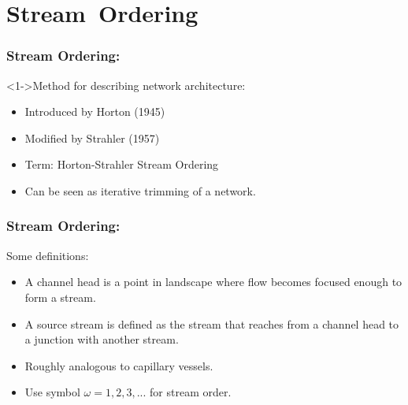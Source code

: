 \begin{frame}

  \showtarotcards{0.35}{
    john-dory,
    overview,
    complex-networks,
    random-networks,
    scale-free-networks,
    small-world-networks,
    theory-six-degrees,
    landscapes-of-forking-paths,
    networks-of-blood,
    trees-of-reality,
    orders-of-streams,
}

\end{frame}

\section{Stream\ Ordering}

\begin{frame}[label=]
  \frametitle{Stream Ordering:}

  \begin{block}<1->{Method for describing network architecture:}
    \begin{itemize}
    \item<2->
      Introduced by Horton (1945)\cite{horton1945a}
    \item<3-> 
      Modified by Strahler (1957)\cite{strahler1952a}
    \item<4-> 
      Term: Horton-Strahler Stream Ordering\cite{rodriguez-iturbe1997a}
    \item<5->
      Can be seen as \alert{iterative trimming} of a network.
    \end{itemize}
  \end{block}

\end{frame}

\begin{frame}[label=]
  \frametitle{Stream Ordering:}

  \begin{block}{Some definitions:}
    \begin{itemize}
    \item<1-> A \alert{channel head} is a point in landscape
      where flow becomes focused enough to form a stream.
    \item<2-> A \alert{source stream} is defined as the 
      stream that reaches from a channel head
      to a junction with another stream.
    \item<3-> Roughly analogous to capillary vessels.
    \item<4-> Use symbol $\omega=1, 2, 3, ...$ for stream order.
    \end{itemize}
    
  \end{block}

\end{frame}

